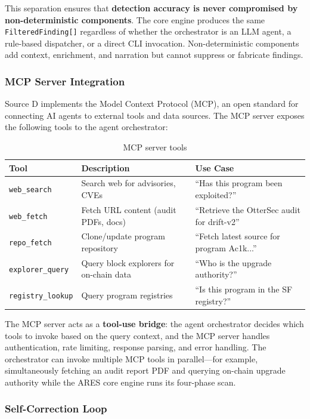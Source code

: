 \documentclass{article}
\begin{document}
This separation ensures that \textbf{detection accuracy is never compromised by non-deterministic components}. The core engine produces the same \texttt{FilteredFinding[]} regardless of whether the orchestrator is an LLM agent, a rule-based dispatcher, or a direct CLI invocation. Non-deterministic components add context, enrichment, and narration but cannot suppress or fabricate findings.

\subsubsection{MCP Server Integration}

Source D implements the Model Context Protocol (MCP), an open standard for connecting AI agents to external tools and data sources. The MCP server exposes the following tools to the agent orchestrator:

\begin{table}[H]
  \caption{MCP server tools}
  \label{tab:mcp_tools}
  \centering
  \begin{tabular}{lll}
    \toprule
    Tool & Description & Use Case \\
    \midrule
    \texttt{web\_search} & Search web for advisories, CVEs & ``Has this program been exploited?'' \\
    \texttt{web\_fetch} & Fetch URL content (audit PDFs, docs) & ``Retrieve the OtterSec audit for drift-v2'' \\
    \texttt{repo\_fetch} & Clone/update program repository & ``Fetch latest source for program Ac1k...'' \\
    \texttt{explorer\_query} & Query block explorers for on-chain data & ``Who is the upgrade authority?'' \\
    \texttt{registry\_lookup} & Query program registries & ``Is this program in the SF registry?'' \\
    \bottomrule
  \end{tabular}
\end{table}

The MCP server acts as a \textbf{tool-use bridge}: the agent orchestrator decides which tools to invoke based on the query context, and the MCP server handles authentication, rate limiting, response parsing, and error handling. The orchestrator can invoke multiple MCP tools in parallel---for example, simultaneously fetching an audit report PDF and querying on-chain upgrade authority while the ARES core engine runs its four-phase scan.

\subsubsection{Self-Correction Loop}
\end{document}

